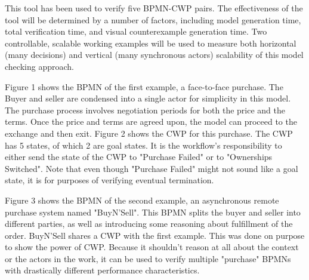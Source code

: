 This tool has been used to verify five BPMN-CWP pairs. The effectiveness of the tool will be determined by a number of factors, including model generation time, total verification time, and visual counterexample generation time. Two controllable, scalable working examples will be used to measure both horizontal (many decisions) and vertical (many synchronous actors) scalability of this model checking approach.


Figure 1 shows the BPMN of the first example, a face-to-face purchase. The Buyer and seller are condensed into a single actor for simplicity in this model. The purchase process involves negotiation periods for both the price and the terms. Once the price and terms are agreed upon, the model can proceed to the exchange and then exit. Figure 2 shows the CWP for this purchase. The CWP has 5 states, of which 2 are goal states. It is the workflow's responsibility to either send the state of the CWP to "Purchase Failed" or to "Ownerships Switched". Note that even though "Purchase Failed" might not sound like a goal state, it is for purposes of verifying eventual termination.



Figure 3 shows the BPMN of the second example, an asynchronous remote purchase system named "BuyN'Sell". This BPMN splits the buyer and seller into different parties, as well as introducing some reasoning about fulfillment of the order. BuyN'Sell shares a CWP with the first example. This was done on purpose to show the power of CWP. Because it shouldn't reason at all about the context or the actors in the work, it can be used to verify multiple "purchase" BPMNs with drastically different performance characteristics.

